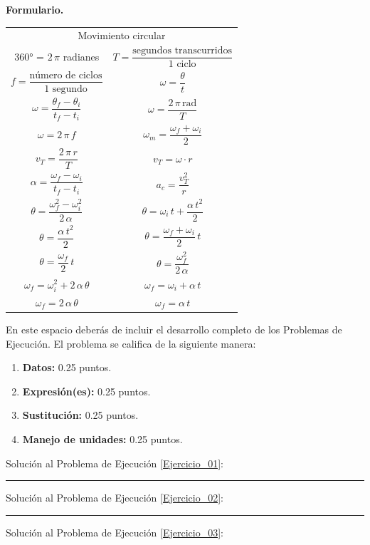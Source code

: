 \documentclass[12pt, letter]{exam}
\begin{document}
\newpage

\textbf{\huge{Formulario.}}
\begin{table}[H]
    \centering
    \setlength{\tabcolsep}{40pt}
    \renewcommand{\arraystretch}{2}
    \begin{tabular}{c  c}
        \multicolumn{2}{c}{Movimiento circular} \\
        \ang{360} = $2 \, \pi$ radianes & $T = \dfrac{\text{segundos transcurridos}}{\text{1 ciclo}}$ \\
        $f = \dfrac{\text{número de ciclos}}{\text{1 segundo}}$ & $\omega = \dfrac{\theta}{t}$ \\
        $\omega = \dfrac{\theta_{f} - \theta_{i}}{t_{f} - t_{i}}$ & $\omega = \dfrac{2 \, \pi \, \text{rad}}{T}$ \\
        $\omega = 2 \, \pi \, f $ & $\omega_{m} = \dfrac{\omega_{f} + \omega_{i}}{2}$ \\
        $v_{T} = \dfrac{2 \, \pi \, r}{T}$ & $v_{T} = \omega \cdot r$ \\
        $\alpha = \dfrac{\omega_{f} - \omega_{i}}{t_{f} - t_{i}}$ & $a_{c} = \dfrac{v_{T}^{2}}{r}$ \\
        $\theta = \dfrac{\omega_{f}^{2} - \omega_{i}^{2}}{2 \, \alpha}$ & $\theta = \omega_{i} \, t + \dfrac{\alpha \, t^{2}}{2}$ \\
        $\theta = \dfrac{\alpha \, t^{2}}{2}$ & $\theta = \dfrac{\omega_{f} + \omega_{i}}{2} \, t$ \\
        $\theta = \dfrac{\omega_{f}}{2} \, t$ & $\theta = \dfrac{\omega_{f}^{2}}{2 \, \alpha}$ \\
        $\omega_{f} = \omega_{i}^{2} + 2 \, \alpha \, \theta$ & $\omega_{f} = \omega_{i} + \alpha \, t$ \\
        $\omega_{f} = 2 \, \alpha \, \theta$ & $\omega_{f} = \alpha \, t$ \\ \hline
        
\end{tabular}
\end{table}

\newpage

En este espacio deberás de incluir el desarrollo completo de los Problemas de Ejecución. El problema se califica de la siguiente manera:
\begin{enumerate}[label=\alph*)]
\item \textbf{Datos:} 0.25 puntos.
\item \textbf{Expresión(es):} 0.25 puntos.
\item \textbf{Sustitución:} 0.25 puntos.
\item \textbf{Manejo de unidades:} 0.25 puntos.
\end{enumerate}

\vspace*{0.5cm}

Solución al Problema de Ejecución \ref{Ejercicio_01}:

\vspace*{4cm}
\rule{0.9\textwidth}{0.3mm}

Solución al Problema de Ejecución \ref{Ejercicio_02}:

\vspace*{4cm}
\rule{0.9\textwidth}{0.3mm}

Solución al Problema de Ejecución \ref{Ejercicio_03}:
\end{document}
